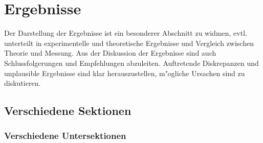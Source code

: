 \newpage
\chapter{Ergebnisse}
Der Darstellung der Ergebnisse ist ein besonderer Abschnitt zu widmen,
evtl. unterteilt in experimentelle und theoretische Ergebnisse und
Vergleich zwischen Theorie und Messung. Aus der Diskussion der
Ergebnisse sind auch Schlussfolgerungen und Empfehlungen
abzuleiten. Auftretende Diskrepanzen und unplausible Ergebnisse sind
klar herauszustellen, m"ogliche Ursachen sind zu diskutieren.

\section{Verschiedene Sektionen}
\subsection{Verschiedene Untersektionen}

